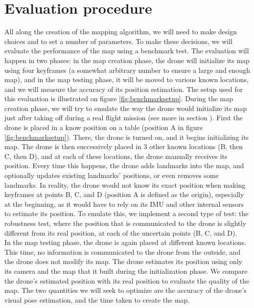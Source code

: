 \section{Evaluation procedure} \label{evalproc}
All along the creation of the mapping algorithm, we will need to make design choices and to set a number of parameters. To make these decisions, we will evaluate the performance of the map using a benchmark test.
The evaluation will happen in two phases: in the map creation phase, the drone will initialize its map using four keyframes (a somewhat arbitrary number to ensure a large and enough map), and in the map testing phase, it will be moved to various known locations, and we will measure the accuracy of its position estimation. The setup used for this evaluation is illustrated on figure \ref{fig:benchmarksetup}. During the map creation phase, we will try to emulate the way the drone would initialize its map just after taking off during a real flight mission (see more in section %
). First the drone is placed in a know position on a table (position A in figure \ref{fig:benchmarksetup}). There, the drone is turned on, and it begins initializing its map. The drone is then successively placed in 3 other known locations (B, then C, then D), and at each of these locations,  the drone manually receives its position. Every time this happens, the drone adds landmarks into the map, and optionally updates existing landmarks' positions, or even removes some landmarks. In reality, the drone would not know its exact position when making keyframes at points B, C, and D (position A is defined as the origin), especially at the beginning, as it would have to rely on its IMU and other internal sensors to estimate its position. To emulate this, we implement a second type of test: the robustness test, where the position that is communicated to the drone is slightly different from its real position, at each of the uncertain points (B, C, and D).\\
In the map testing phase, the drone is again placed at different known locations. This time, no information is communicated to the drone from the outside, and the drone does not modify its map. The drone estimates its position using only its camera and the map that it built during the initialization phase. We compare the drone's estimated position with its real position to evaluate the quality of the map. The two quantities we will seek to optimize are the accuracy of the drone's visual pose estimation, and the time taken to create the map.


